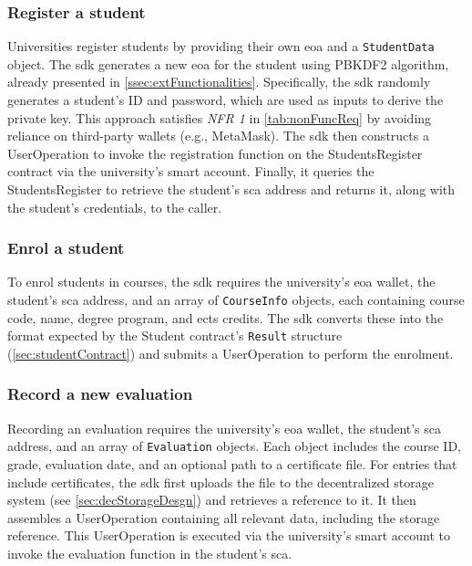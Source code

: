 \subsubsection{Register a student}
Universities register students by providing their own \acrshort{eoa} and a \texttt{StudentData} object. The \acrshort{sdk} generates a new \acrshort{eoa} for the student using PBKDF2 algorithm, already presented in \cref{ssec:extFunctionalities}. Specifically, the \acrshort{sdk} randomly generates a student's ID and password, which are used as inputs to derive the private key. This approach satisfies \textit{NFR 1} in \cref{tab:nonFuncReq} by avoiding reliance on third-party wallets (e.g., MetaMask). The \acrshort{sdk} then constructs a UserOperation to invoke the registration function on the StudentsRegister contract via the university's smart account. Finally, it queries the StudentsRegister to retrieve the student's \acrshort{sca} address and returns it, along with the student's credentials, to the caller.

\subsubsection{Enrol a student}
To enrol students in courses, the \acrshort{sdk} requires the university's \acrshort{eoa} wallet, the student's \acrshort{sca} address, and an array of \texttt{CourseInfo} objects, each containing course code, name, degree program, and \acrshort{ects} credits. The \acrshort{sdk} converts these into the format expected by the Student contract's \texttt{Result} structure (\cref{sec:studentContract}) and submits a UserOperation to perform the enrolment.

\subsubsection{Record a new evaluation}
Recording an evaluation requires the university’s \acrshort{eoa} wallet, the student’s \acrshort{sca} address, and an array of \texttt{Evaluation} objects. Each object includes the course ID, grade, evaluation date, and an optional path to a certificate file. For entries that include certificates, the \acrshort{sdk} first uploads the file to the decentralized storage system (see \cref{sec:decStorageDesgn}) and retrieves a reference to it. It then assembles a UserOperation containing all relevant data, including the storage reference. This UserOperation is executed via the university's smart account to invoke the evaluation function in the student's \acrshort{sca}.

